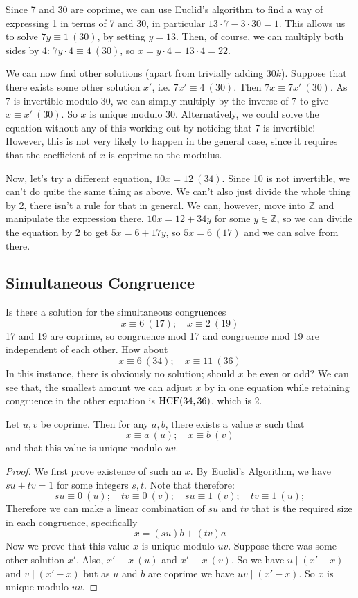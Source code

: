 Since 7 and 30 are coprime, we can use Euclid's algorithm to find a way of expressing 1 in terms of 7 and 30, in particular \(13 \cdot 7 - 3\cdot 30 = 1\). This allows us to solve \(7y \equiv 1\ (30)\), by setting \(y=13\). Then, of course, we can multiply both sides by 4: \(7 y\cdot 4 \equiv 4\ (30)\), so \(x = y \cdot 4 = 13 \cdot 4 = 22\).

We can now find other solutions (apart from trivially adding \(30k\)). Suppose that there exists some other solution \(x'\), i.e. \(7x' \equiv 4\ (30)\). Then \(7x \equiv 7x'\ (30)\). As 7 is invertible modulo 30, we can simply multiply by the inverse of 7 to give \(x \equiv x'\ (30)\). So \(x\) is unique modulo 30. Alternatively, we could solve the equation without any of this working out by noticing that 7 is invertible! However, this is not very likely to happen in the general case, since it requires that the coefficient of \(x\) is coprime to the modulus.

Now, let's try a different equation, \(10x = 12\ (34)\). Since 10 is not invertible, we can't do quite the same thing as above. We can't also just divide the whole thing by 2, there isn't a rule for that in general. We can, however, move into \(\mathbb Z\) and manipulate the expression there. \(10x = 12 + 34y\) for some \(y \in \mathbb Z\), so we can divide the equation by 2 to get \(5x = 6 + 17y\), so \(5x = 6\ (17)\) and we can solve from there.

\subsection{Simultaneous Congruence}
Is there a solution for the simultaneous congruences
\[ x \equiv 6\ (17);\quad x \equiv 2\ (19) \]
17 and 19 are coprime, so congruence mod 17 and congruence mod 19 are independent of each other. How about
\[ x \equiv 6\ (34);\quad x \equiv 11\ (36) \]
In this instance, there is obviously no solution; should \(x\) be even or odd? We can see that, the smallest amount we can adjust \(x\) by in one equation while retaining congruence in the other equation is \(\operatorname{HCF}(34, 36)\), which is 2.
\begin{theorem}
	Let \(u, v\) be coprime. Then for any \(a, b\), there exists a value \(x\) such that
	\[ x \equiv a\ (u);\quad x \equiv b\ (v) \]
	and that this value is unique modulo \(uv\).
\end{theorem}
\begin{proof}
	We first prove existence of such an \(x\). By Euclid's Algorithm, we have \(su + tv = 1\) for some integers \(s, t\). Note that therefore:
	\[ su \equiv 0\ (u);\quad tv \equiv 0\ (v);\quad su \equiv 1\ (v);\quad tv \equiv 1\ (u); \]
	Therefore we can make a linear combination of \(su\) and \(tv\) that is the required size in each congruence, specifically
	\[ x = (su)b + (tv)a \]
	Now we prove that this value \(x\) is unique modulo \(uv\). Suppose there was some other solution \(x'\). Also, \(x' \equiv x\ (u)\) and \(x' \equiv x\ (v)\). So we have \(u\mid (x' - x)\) and \(v\mid (x' - x)\) but as \(u\) and \(b\) are coprime we have \(uv\mid (x' - x)\). So \(x\) is unique modulo \(uv\).
\end{proof}
